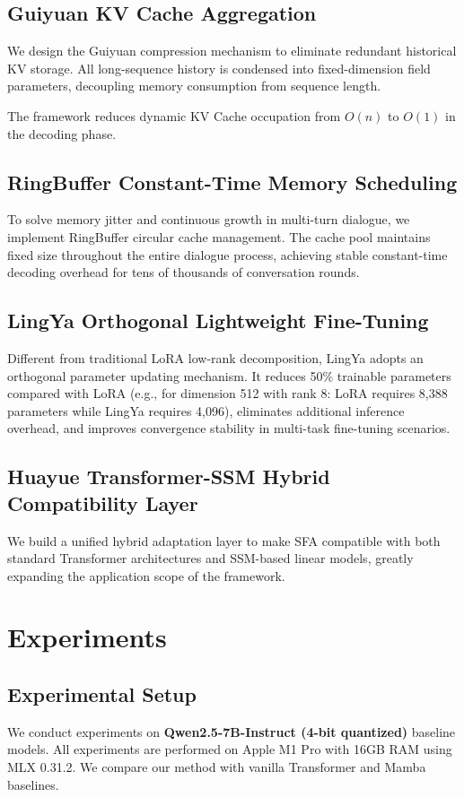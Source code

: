 \documentclass{article}
\begin{document}
\subsection{Guiyuan KV Cache Aggregation}
We design the Guiyuan compression mechanism to eliminate redundant historical KV storage. All long-sequence history is condensed into fixed-dimension field parameters, decoupling memory consumption from sequence length.

The framework reduces dynamic KV Cache occupation from $O(n)$ to $O(1)$ in the decoding phase.

\subsection{RingBuffer Constant-Time Memory Scheduling}
To solve memory jitter and continuous growth in multi-turn dialogue, we implement RingBuffer circular cache management. The cache pool maintains fixed size throughout the entire dialogue process, achieving stable constant-time decoding overhead for tens of thousands of conversation rounds.

\subsection{LingYa Orthogonal Lightweight Fine-Tuning}
Different from traditional LoRA low-rank decomposition, LingYa adopts an orthogonal parameter updating mechanism. It reduces 50\% trainable parameters compared with LoRA (e.g., for dimension 512 with rank 8: LoRA requires 8,388 parameters while LingYa requires 4,096), eliminates additional inference overhead, and improves convergence stability in multi-task fine-tuning scenarios.

\subsection{Huayue Transformer-SSM Hybrid Compatibility Layer}
We build a unified hybrid adaptation layer to make SFA compatible with both standard Transformer architectures and SSM-based linear models, greatly expanding the application scope of the framework.

\section{Experiments}
\subsection{Experimental Setup}
We conduct experiments on \textbf{Qwen2.5-7B-Instruct (4-bit quantized)} baseline models. All experiments are performed on Apple M1 Pro with 16GB RAM using MLX 0.31.2. We compare our method with vanilla Transformer and Mamba baselines.
\end{document}
